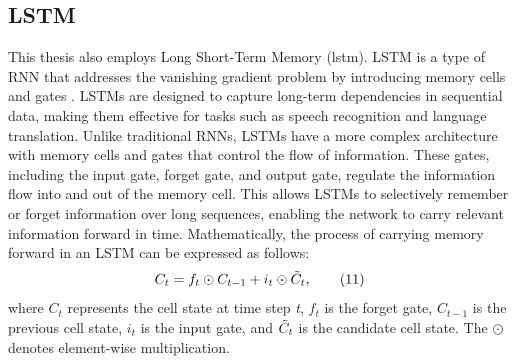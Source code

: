 \subsection{LSTM}
This thesis also employs Long Short-Term Memory (\acrshort{lstm}). LSTM is a type of RNN that addresses the vanishing gradient problem by introducing memory cells and gates \cite{_LSTM_10.1162/neco.1997.9.8.1735}. LSTMs are designed to capture long-term dependencies in sequential data, making them effective for tasks such as speech recognition and language translation. Unlike traditional RNNs, LSTMs have a more complex architecture with memory cells and gates that control the flow of information. These gates, including the input gate, forget gate, and output gate, regulate the information flow into and out of the memory cell. This allows LSTMs to selectively remember or forget information over long sequences, enabling the network to carry relevant information forward in time. Mathematically, the process of carrying memory forward in an LSTM can be expressed as follows:
\begin{equation*}
    C_{t} = f_{t} \odot C_{t-1} + i_{t} \odot \Tilde{C}_{t},\tag{11}
\end{equation*}
%
where $C_{t}$ represents the cell state at time step \textit{t}, $f_{t}$ is the forget gate, $C_{t-1}$ is the previous cell state, $i_{t}$ is the input gate, and $\Tilde{C}_{t}$ is the candidate cell state. The $\odot$ denotes element-wise multiplication.

